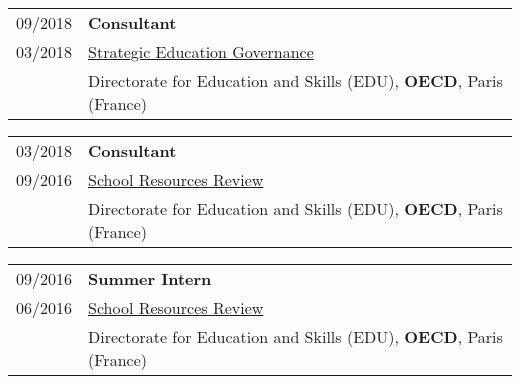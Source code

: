 \documentclass[a4paper,11pt]{article} %
\begin{document}
\begin{tabular}{r|p{15cm}}
	09/2018 & \textbf{Consultant} \\
	03/2018 & \href{http://www.oecd.org/education/ceri/strategic-education-governance.htm}{Strategic Education Governance} \\
	& Directorate for Education and Skills (EDU), \textbf{OECD}, Paris (France) \\ 
	
	
\end{tabular}

\begin{tabular}{r|p{15cm}}
	03/2018 & \textbf{Consultant} \\
	09/2016 & \href{http://www.oecd.org/education/school-resources-review/}{School Resources Review} \\ 
	& Directorate for Education and Skills (EDU), \textbf{OECD}, Paris (France) \\ 
	
	
\end{tabular}

\begin{tabular}{r|p{15cm}}
	09/2016 & \textbf{Summer Intern} \\
	06/2016 & \href{http://www.oecd.org/education/school-resources-review/}{School Resources Review} \\ 
	& Directorate for Education and Skills (EDU), \textbf{OECD}, Paris (France) \\
	
\end{tabular}
\end{document}
